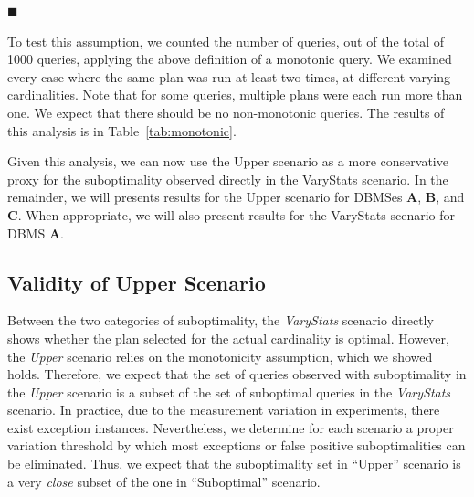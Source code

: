 {\hfill$\blacksquare$

To test this assumption, we counted the number of queries, out of the total
of 1000 queries, applying the above definition of a monotonic query. We
examined every case where the same plan was run at least two times, at
different varying cardinalities. Note that for some queries, multiple plans
were each run more than one.  We
expect that there should be no non-monotonic queries. The results of this
analysis is in Table~\ref{tab:monotonic}.

\begin{table}
\caption{\label{tab:monotonic}}
\end{table}


Given this analysis, we can now use the Upper scenario as a more
conservative proxy for the suboptimality observed directly in the
VaryStats scenario. In the remainder, we will presents results for the
Upper scenario for DBMSes {\bf A}, {\bf B}, and {\bf C}. When appropriate,
we will also present results for the VaryStats scenario for DBMS {\bf A}.


\subsection{Validity of Upper Scenario}
Between the two categories of suboptimality, the {\em VaryStats}
scenario directly shows whether the plan selected for the actual cardinality
is optimal.  However, the {\em Upper} scenario relies on the monotonicity
assumption, which we showed holds. Therefore, we expect that the set of
queries observed with suboptimality in the {\em Upper} scenario is a subset
of the set of suboptimal queries in the {\em VaryStats} scenario. In
practice, due to the measurement variation in experiments, there exist
exception instances. Nevertheless, we determine for each scenario a proper
variation threshold by which most exceptions or false positive
suboptimalities can be eliminated. Thus, we expect that the suboptimality
set in ``Upper'' scenario is a very {\em close} subset of the one in
``Suboptimal'' scenario.

}
